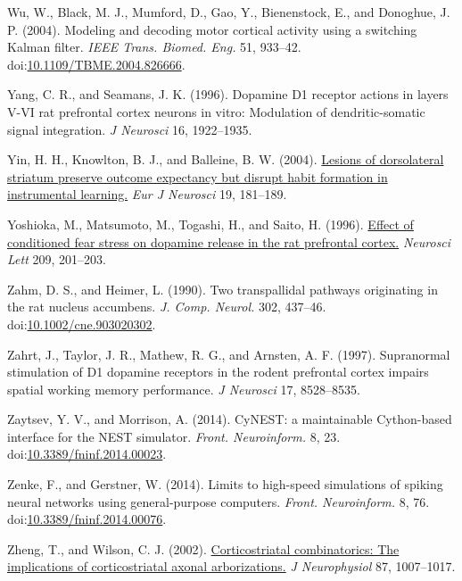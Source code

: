 \documentclass[
  11pt,
  a4paper,
]{scrbook}
\newlength{\cslhangindent}
\newenvironment{CSLReferences}[2] %
 {\begin{list}{}{%
  \setlength{\itemindent}{0pt}
  \setlength{\leftmargin}{0pt}
  \setlength{\parsep}{0pt}
  \ifodd #1
   \setlength{\leftmargin}{\cslhangindent}
   \setlength{\itemindent}{-1\cslhangindent}
  \fi
  \setlength{\itemsep}{#2\baselineskip}}}
 {\end{list}}
\begin{document}
\begin{CSLReferences}{1}{1}
Wu, W., Black, M. J., Mumford, D., Gao, Y., Bienenstock, E., and
Donoghue, J. P. (2004). {Modeling and decoding motor cortical activity
using a switching Kalman filter.} \emph{IEEE Trans. Biomed. Eng.} 51,
933--42.
doi:\href{https://doi.org/10.1109/TBME.2004.826666}{10.1109/TBME.2004.826666}.

Yang, C. R., and Seamans, J. K. (1996). Dopamine {D1} receptor actions
in layers {V-VI} rat prefrontal cortex neurons in vitro: Modulation of
dendritic-somatic signal integration. \emph{J Neurosci} 16, 1922--1935.

Yin, H. H., Knowlton, B. J., and Balleine, B. W. (2004).
\href{https://www.ncbi.nlm.nih.gov/pubmed/14750976}{Lesions of
dorsolateral striatum preserve outcome expectancy but disrupt habit
formation in instrumental learning.} \emph{Eur J Neurosci} 19, 181--189.

Yoshioka, M., Matsumoto, M., Togashi, H., and Saito, H. (1996).
\href{https://www.ncbi.nlm.nih.gov/pubmed/8736645}{Effect of conditioned
fear stress on dopamine release in the rat prefrontal cortex.}
\emph{Neurosci Lett} 209, 201--203.

Zahm, D. S., and Heimer, L. (1990). {Two transpallidal pathways
originating in the rat nucleus accumbens.} \emph{J. Comp. Neurol.} 302,
437--46.
doi:\href{https://doi.org/10.1002/cne.903020302}{10.1002/cne.903020302}.

Zahrt, J., Taylor, J. R., Mathew, R. G., and Arnsten, A. F. (1997).
Supranormal stimulation of D1 dopamine receptors in the rodent
prefrontal cortex impairs spatial working memory performance. \emph{J
Neurosci} 17, 8528--8535.

Zaytsev, Y. V., and Morrison, A. (2014). {CyNEST: a maintainable
Cython-based interface for the NEST simulator.} \emph{Front.
Neuroinform.} 8, 23.
doi:\href{https://doi.org/10.3389/fninf.2014.00023}{10.3389/fninf.2014.00023}.

Zenke, F., and Gerstner, W. (2014). {Limits to high-speed simulations of
spiking neural networks using general-purpose computers.} \emph{Front.
Neuroinform.} 8, 76.
doi:\href{https://doi.org/10.3389/fninf.2014.00076}{10.3389/fninf.2014.00076}.

Zheng, T., and Wilson, C. J. (2002).
\href{https://www.ncbi.nlm.nih.gov/pubmed/11826064}{Corticostriatal
combinatorics: The implications of corticostriatal axonal
arborizations.} \emph{J Neurophysiol} 87, 1007--1017.


\end{CSLReferences}
\end{document}
